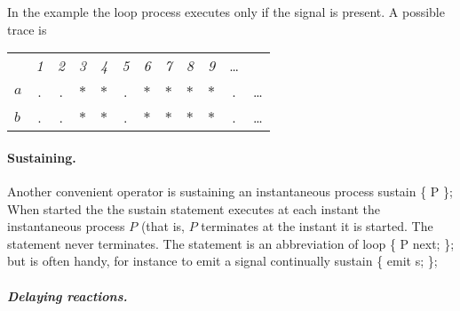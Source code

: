 In the example
%
%
the loop process executes only if the signal  is present. A possible trace is
\begin{center}
  \leavevmode
  \begin{tabular}[]{l@{\quad}||@{\quad} ccccccccccc}
    \hline\hline   
     &{\footnotesize \textit{1}}&{\footnotesize \textit{2}}
     &{\footnotesize \textit{3}}&{\footnotesize \textit{4}}
     &{\footnotesize \textit{5}}&{\footnotesize \textit{6}}
     &{\footnotesize \textit{7}}&{\footnotesize \textit{8}}
     &{\footnotesize \textit{9}}&\ldots
   \\  
    \hbox{$a$} &.&.&$*$&$*$&.&$*$&$*$&$*$&$*$&.&\ldots
   \\
    \hbox{$b$} &.&.&$*$&$*$&.&$*$&$*$&$*$&$*$&.&\ldots
    \\   
    \hline\hline
  \end{tabular}
\end{center} 


\paragraph{Sustaining.}
Another convenient operator is sustaining an instantaneous process
% 
\BEP
sustain \{ P \};
\EEP
% 
When started the the sustain statement executes at each instant the 
instantaneous process $P$ (that is, $P$ terminates at the instant it 
is started. The statement never terminates. The statement is 
an abbreviation of
% 
\BEP
loop \{ 
   P 
   next;
\};
\EEP
% 
but is often handy, for instance to emit a signal continually
% 
\BEP
sustain \{ emit s; \};
\EEP
%

\paragraph{\textit{Delaying reactions.}}

